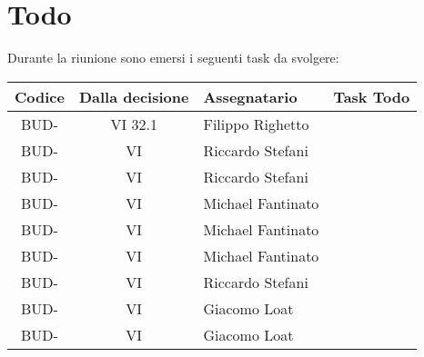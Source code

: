 
\section{Todo}

Durante la riunione sono emersi i seguenti task da svolgere:

\vspace{0.5cm}

\begin{table}[htbp]
\centering
{}
\begin{tabular}{|c|c|p{}|p{}|}
    \hline
    \rowcolor[gray]{0.75}
    \textbf{Codice} & \textbf{Dalla decisione} & \textbf{Assegnatario} & \textbf{Task Todo} \\
    \hline
    BUD- & VI 32.1 & Filippo Righetto & \\
    \hline
    BUD- & VI & Riccardo Stefani & \\
    \hline
    BUD- & VI & Riccardo Stefani &  \\
    \hline 
    BUD- & VI & Michael Fantinato &  \\
    \hline
    BUD- & VI & Michael Fantinato &  \\
    \hline
    BUD- & VI & Michael Fantinato &  \\
    \hline
    BUD- & VI & Riccardo Stefani &  \\
    \hline
    BUD- & VI & Giacomo Loat &  \\
    \hline
    BUD- & VI & Giacomo Loat &  \\
    \hline
\end{tabular}
\end{table}
